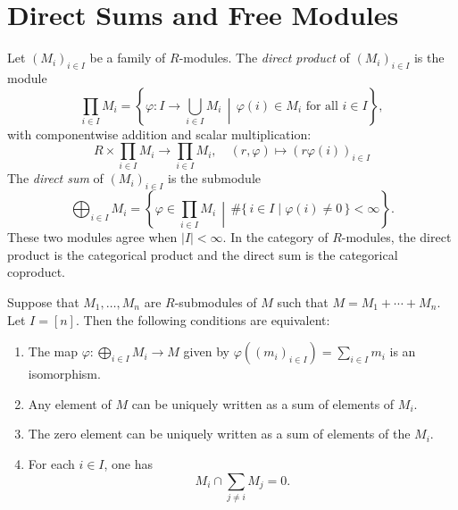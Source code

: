 \section{Direct Sums and Free Modules}

\begin{definition}
    Let $(M_i)_{i \in I}$ be a family of $R$-modules. The \emph{direct product} of $(M_i)_{i \in I}$ is the module
    \[
        \prod_{i \in I} M_i
        =
        \left\{ \varphi\colon I \to \bigcup_{i \in I} M_i \,\middle|\, \varphi(i) \in M_i \text{ for all } i \in I \right\},
    \]
    with componentwise addition and scalar multiplication:
    \[
        R \times \prod_{i \in I} M_i \to \prod_{i \in I} M_i, \quad (r, \varphi) \mapsto (r \varphi(i))_{i \in I}
    \]
    The \emph{direct sum} of $(M_i)_{i \in I}$ is the submodule
    \[
        \bigoplus_{i \in I} M_i
        =
        \left\{ \varphi \in \prod_{i \in I} M_i \,\middle|\, \#\{\, i \in I \mid \varphi(i) \neq 0 \,\} < \infty \right\}.
    \]
    These two modules agree when $|I| < \infty$. In the category of $R$-modules, the direct product is the categorical product and the direct sum is the categorical coproduct.
\end{definition}

\begin{theorem}
    Suppose that $M_1, \ldots, M_n$ are $R$-submodules of $M$ such that $M = M_1 + \cdots + M_n$. Let $I = [n]$. Then the following conditions are equivalent:
    \begin{enumerate}
        \item The map $\varphi\colon \bigoplus_{i \in I} M_i \to M$ given by $\varphi((m_i)_{i \in I}) = \sum_{i \in I} m_i$ is an isomorphism.
        \item Any element of $M$ can be uniquely written as a sum of elements of $M_i$.
        \item The zero element can be uniquely written as a sum of elements of the $M_i$.
        \item For each $i \in I$, one has
              \[
                  M_i \cap \sum_{j \neq i} M_j = 0.
              \]
    \end{enumerate}
\end{theorem}

